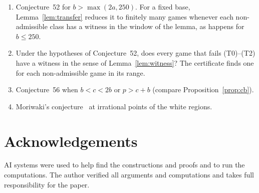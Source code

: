 \documentclass[11pt]{amsart}
\theoremstyle{definition}
\numberwithin{equation}{section}
\begin{document}
\begin{enumerate}
\item Conjecture~52 for $b>\max(2a,250)$. For a fixed base, Lemma~\ref{lem:transfer}
reduces it to finitely many games whenever each non-admissible class has a witness in the
window of the lemma, as happens for $b\le250$.
\item Under the hypotheses of Conjecture~52, does every game that fails (T0)--(T2) have a
witness in the sense of Lemma~\ref{lem:witness}? The certificate finds one for each
non-admissible game in its range.
\item Conjecture~56 when $b<c<2b$ or $p>c+b$ (compare Proposition~\ref{prop:cb}).
\item Moriwaki's conjecture~\cite[Remark~5]{Moriwaki} at irrational points of the white
regions.
\end{enumerate}

\section*{Acknowledgements}

AI systems were used to help find the constructions and proofs and to run the
computations. The author verified all arguments and computations and takes full
responsibility for the paper.
\end{document}
